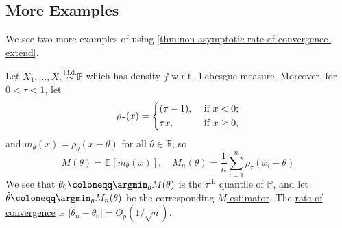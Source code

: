 \subsection{More Examples}
We see two more examples of using \autoref{thm:non-asymptotic-rate-of-convergence-extend}.

\begin{eg}
	Let \(X_1, \dots , X_n \overset{\text{i.i.d.} }{\sim } \mathbb{P} \)  which has density \(f\) w.r.t.\ Lebesgue measure. Moreover, for \(0 < \tau < 1\), let
	\[
		\rho _{\tau } (x) = \begin{dcases}
			(\tau -1 ), & \text{ if } x < 0 ;    \\
			\tau x,     & \text{ if } x \geq 0 ,
		\end{dcases}
	\]
	and \(m_\theta (x) = \rho _\theta (x - \theta )\) for all \(\theta \in \mathbb{R} \), so
	\[
		M(\theta )= \mathbb{E}_{}\left[m_\theta (x) \right],\quad
		M_n(\theta ) = \frac{1}{n} \sum_{i=1}^{n} \rho _{\tau } (x_i - \theta )
	\]
	We see that \(\theta _0 \coloneqq \argmin_{\theta } M(\theta )\) is the \(\tau ^{\text{th} }\) quantile of \(\mathbb{P} \), and let \(\hat{\theta} \coloneqq \argmin_{\theta } M_n(\theta )\) be the corresponding \hyperref[prb:M-estimation]{\(M\)-estimator}. The \hyperref[def:rate-of-convergence]{rate of convergence} is \(\vert \hat{\theta} _n - \theta _0 \vert = O_p(1 / \sqrt{n} )\).
\end{eg}
